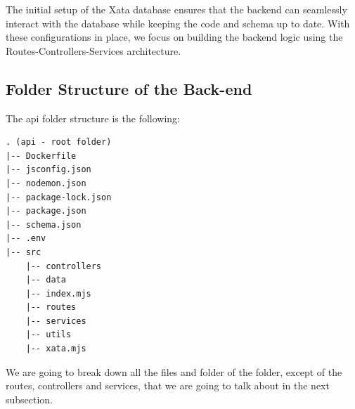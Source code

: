 \vspace{5mm}

\noindent The initial setup of the Xata database ensures that the backend can seamlessly interact with the database while keeping the code and schema up to date. With these configurations in place, we focus on building the backend logic using the Routes-Controllers-Services architecture.

\subsection{Folder Structure of the Back-end}

The api folder structure is the following:

\vspace{5mm}

\begin{lstlisting}[caption=api Folder Structure]
. (api - root folder)
|-- Dockerfile
|-- jsconfig.json
|-- nodemon.json
|-- package-lock.json
|-- package.json
|-- schema.json
|-- .env
|-- src
    |-- controllers
    |-- data
    |-- index.mjs
    |-- routes
    |-- services
    |-- utils
    |-- xata.mjs
\end{lstlisting}

\vspace{5mm}

\noindent We are going to break down all the files and folder of the folder, except of the routes, controllers and services, that we are going to talk about in the next subsection.

